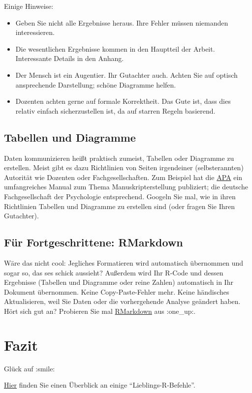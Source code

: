 \documentclass[]{article}
\providecommand{\tightlist}{%
  \setlength{\itemsep}{0pt}\setlength{\parskip}{0pt}}
\begin{document}
Einige Hinweise:

\begin{itemize}
\tightlist
\item
  Geben Sie nicht alle Ergebnisse heraus. Ihre Fehler müssen niemanden
  interessieren.
\item
  Die wesentlichen Ergebnisse kommen in den Hauptteil der Arbeit.
  Interessante Details in den Anhang.
\item
  Der Mensch ist ein Augentier. Ihr Gutachter auch. Achten Sie auf
  optisch ansprechende Darstellung; schöne Diagramme helfen.
\item
  Dozenten achten gerne auf formale Korrektheit. Das Gute ist, dass dies
  relativ einfach sicherzustellen ist, da auf starren Regeln basierend.
\end{itemize}

\hypertarget{tabellen-und-diagramme}{%
\subsection{Tabellen und Diagramme}\label{tabellen-und-diagramme}}

Daten kommunizieren heißt praktisch zumeist, Tabellen oder Diagramme zu
erstellen. Meist gibt es dazu Richtlinien von Seiten irgendeiner
(selbsterannten) Autorität wie Dozenten oder Fachgesellschaften. Zum
Beispiel hat die \href{http://www.apa.org}{APA} ein umfangreiches Manual
zum Thema Manuskripterstellung publiziert; die deutsche Fachgesellschaft
der Psychologie entsprechend. Googeln Sie mal, wie in ihren Richtlinien
Tabellen und Diagramme zu erstellen sind (oder fragen Sie Ihren
Gutachter).

\hypertarget{fur-fortgeschrittene-rmarkdown}{%
\subsection{Für Fortgeschrittene:
RMarkdown}\label{fur-fortgeschrittene-rmarkdown}}

Wäre das nicht cool: Jegliches Formatieren wird automatisch übernommen
und sogar so, das ses schick aussieht? Außerdem wird Ihr R-Code und
dessen Ergebnisse (Tabellen und Diagramme oder reine Zahlen) automatisch
in Ihr Dokument übernommen. Keine Copy-Paste-Fehler mehr. Keine
händisches Aktualisieren, weil Sie Daten oder die vorhergehende Analyse
geändert haben. Hört sich gut an? Probieren Sie mal
\href{http://rmarkdown.rstudio.com}{RMarkdown} aus :one\_up:.

\hypertarget{fazit}{%
\section{Fazit}\label{fazit}}

Glück auf :smile:

\href{https://sebastiansauer.github.io/Lieblingsbefehle/}{Hier} finden
Sie einen Überblick an einige ``Lieblings-R-Befehle''.
\end{document}
